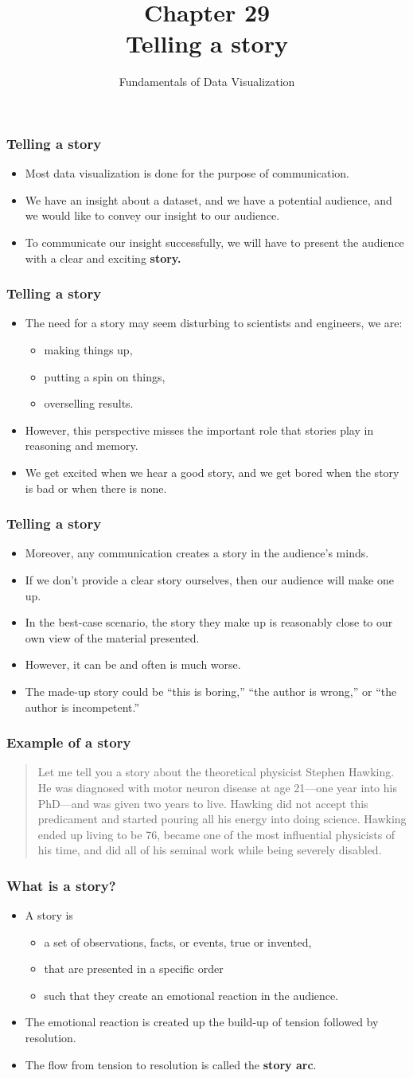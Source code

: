 \documentclass{beamer}
\author{Fundamentals of Data Visualization}
\title{Chapter 29\\Telling a story}
\newcommand{\bi}{\begin{itemize}}
\newcommand{\li}{\item}
\newcommand{\ei}{\end{itemize}}
\newcommand{\bfr}[1]{\begin{frame}[fragile]\frametitle{{ #1 }}}
\begin{document}
\begin{frame}
\maketitle
\end{frame}

\bfr{Telling a story}
\bi
\li Most data visualization is done for the purpose of communication.
\li We have an insight about a dataset, and we have a potential audience, and we would like to convey our insight to our audience.
\li To communicate our insight successfully, we will have to present the audience with a clear and exciting {\bf story.} 
\ei
\end{frame}

\bfr{Telling a story}

\bi
\li The need for a story may seem disturbing to scientists and engineers, we are:
\bi
\li making things up, 
\li putting a spin on things, 
\li  overselling results.
\ei
\li However, this perspective misses the important role that stories play in reasoning and memory.
\li We get excited when we hear a good story, and we get bored when the story is bad or when there is none. 
\ei
\end{frame}
\bfr{Telling a story}
\bi
\li Moreover, any communication creates a story in the audience’s minds.
\li If we don’t provide a clear story ourselves, then our audience will make one up.
\li In the best-case scenario, the story they make up is reasonably close to our own view of the material presented.
\li However, it can be and often is much worse. 
\li The made-up story could be “this is boring,” “the author is wrong,” or “the author is incompetent.”
\ei
\end{frame}

\bfr{Example of a story}

\begin{quotation}
Let me tell you a story about the theoretical physicist Stephen Hawking. He was diagnosed with motor neuron disease at age 21—one year into his PhD—and was given two years to live. Hawking did not accept this predicament and started pouring all his energy into doing science. Hawking ended up living to be 76, became one of the most influential physicists of his time, and did all of his seminal work while being severely disabled. 
\end{quotation}
\end{frame}

\bfr{What is a story?}
\bi
\li A story is
\bi
\li a set of observations, facts, or events, true or invented,
\li that are presented in a specific order 
\li such that they create an emotional reaction in the audience.
\ei
\li The emotional reaction is created up the build-up of tension
followed by resolution.
\li The flow from tension to resolution is called the {\bf story arc}.
\ei
\end{frame}
\end{document}
